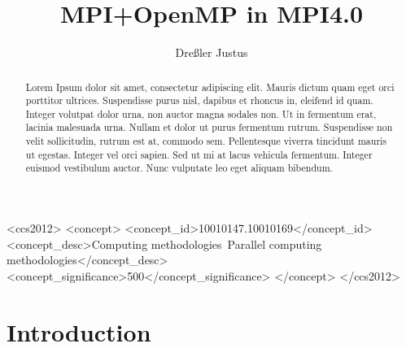 \documentclass[sigconf]{acmart} %
\begin{document}
\title{MPI+OpenMP in MPI4.0}
\author{Dreßler Justus}


\begin{CCSXML}
    <ccs2012>
    <concept>
    <concept_id>10010147.10010169</concept_id>
    <concept_desc>Computing methodologies~Parallel computing methodologies</concept_desc>
    <concept_significance>500</concept_significance>
    </concept>
    </ccs2012>
\end{CCSXML}


\begin{abstract}

    Lorem Ipsum dolor sit amet, consectetur adipiscing elit.
    Mauris dictum quam eget orci porttitor ultrices.
    Suspendisse purus nisl, dapibus et rhoncus in, eleifend id quam. Integer volutpat dolor urna, non auctor magna sodales non.
    Ut in fermentum erat, lacinia malesuada urna.
    Nullam et dolor ut purus fermentum rutrum.
    Suspendisse non velit sollicitudin, rutrum est at, commodo sem. Pellentesque viverra tincidunt mauris ut egestas.
    Integer vel orci sapien. Sed ut mi at lacus vehicula fermentum.
    Integer euismod vestibulum auctor.
    Nunc vulputate leo eget aliquam bibendum.

\end{abstract}

\maketitle


\section{Introduction}
\end{document}
